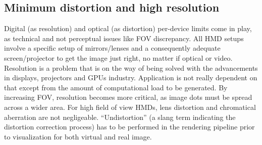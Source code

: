\subsection{Minimum distortion and high resolution}
Digital (as resolution) and optical (as distortion) per-device limits come in play, as technical and not perceptual issues like FOV discrepancy. All HMD setups involve a specific setup of mirrors/lenses and a consequently adequate screen/projector to get the image just right, no matter if optical or video. Resolution is a problem that is on the way of being solved with the advancements in displays, projectors and GPUs industry. Application is not really dependent on that except from the amount of computational load to be generated. By increasing FOV, resolution becomes more critical, as image dots must be spread across a wider area.
For high field of view HMDs, lens distortion and chromatical aberration are not negligeable. “Undistortion” (a slang term indicating the distortion correction process) has to be performed in the rendering pipeline prior to visualization for both virtual and real image.


